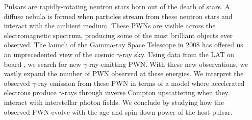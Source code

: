 
Pulsars are rapidly-rotating neutron stars born out of the death of
stars.  A diffuse nebula is formed when particles stream from these
neutron stars and interact with the ambient medium. These \acp{PWN}
are visible across the electromagnetic spectrum,  producing some of the
most brilliant objects ever observed.  The launch of the \fermi Gamma-ray
Space Telescope in 2008 has offered us an unprecedented view of the cosmic
$\gamma$-ray sky.  Using data from the \acrlong{LAT} on board \fermi, 
we search for new $\gamma$-ray-emitting \ac{PWN}.  With these
new observations, we vastly expand the number of \ac{PWN} observed
at these energies. We interpret the observed $\gamma$-ray emission
from these \ac{PWN} in terms of a model where accelerated electrons
produce $\gamma$-rays through inverse Compton upscattering when they
interact with interstellar photon fields.  We conclude by studying how
the observed \ac{PWN} evolve with the age and spin-down power
of the host pulsar.
